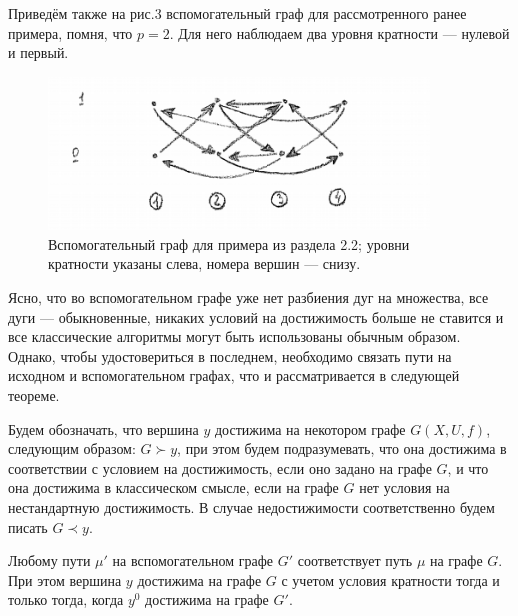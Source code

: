 Приведём также на рис.3 вспомогательный граф для рассмотренного ранее примера, помня, что $p = 2$. Для него наблюдаем два уровня кратности --- нулевой и первый.

\begin{figure}
	\centering
	{\includegraphics[width=0.9\textwidth]{img/3.png}}
	{Вспомогательный граф для примера из раздела 2.2; уровни кратности указаны слева, номера вершин --- снизу.}
	\label{fig:pic_3}
\end{figure}

Ясно, что во вспомогательном графе уже нет разбиения дуг на множества, все дуги --- обыкновенные, никаких условий на достижимость больше не ставится и все классические алгоритмы могут быть использованы обычным образом. Однако, чтобы удостовериться в последнем, необходимо связать пути на исходном и вспомогательном графах, что и рассматривается в следующей теореме. 

\begin{definition}
	Будем обозначать, что вершина $y$ достижима на некотором графе $G(X,U,f)$, следующим образом: $G \succ y$, при этом будем подразумевать, что она достижима в соответствии с условием на достижимость, если оно задано на графе $G$, и что она достижима в классическом смысле, если на графе $G$ нет условия на нестандартную достижимость.
	В случае недостижимости соответственно будем писать $G \prec y$.
\end{definition}

\begin{theorem}
	Любому пути $\mu'$ на вспомогательном графе $G'$ соответствует путь $\mu$ на графе $G$. При этом вершина $y$ достижима на графе $G$ с учетом условия кратности тогда и только тогда, когда $y^0$ достижима на графе $G'$. 
\end{theorem}

